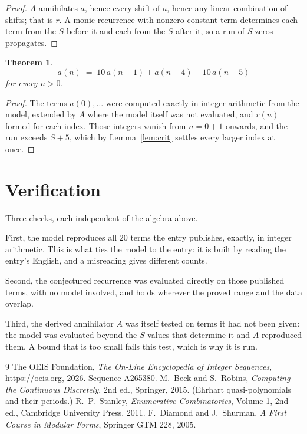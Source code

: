 \documentclass[11pt,a4paper]{article}
\theoremstyle{plain}
\newtheorem{theorem}{Theorem}
\theoremstyle{definition}
\begin{document}
\begin{proof}
$A$ annihilates $a$, hence every shift of $a$, hence any linear combination of shifts; that is
$r$. A monic recurrence with nonzero constant term determines each term from the $S$ before it
and each from the $S$ after it, so a run of $S$ zeros propagates.
\end{proof}

\begin{theorem}
\[
a(n)\;=\;10\,a(n-1) + a(n-4) - 10\,a(n-5)
\]
for every $n>0$.
\end{theorem}

\begin{proof}
The terms $a(0),\dots$ were computed exactly in integer arithmetic from the model, extended by
$A$ where the model itself was not evaluated, and $r(n)$ formed for each index. Those integers
vanish from $n=0+1$ onwards, and the run exceeds $S+5$, which by
Lemma~\ref{lem:crit} settles every larger index at once.
\end{proof}

\section{Verification}

Three checks, each independent of the algebra above.

First, the model reproduces all $20$ terms the entry publishes, exactly, in integer
arithmetic. This is what ties the model to the entry: it is built by reading the entry's
English, and a misreading gives different counts.

Second, the conjectured recurrence was evaluated directly on those published terms, with no
model involved, and holds wherever the proved range and the data overlap.

Third, the derived annihilator $A$ was itself tested on terms it had not been given: the model
was evaluated beyond the $S$ values that determine it and $A$ reproduced them. A bound that is
too small fails this test, which is why it is run.

\begin{thebibliography}{9}
 The OEIS Foundation, \emph{The On-Line Encyclopedia of Integer
Sequences}, \url{https://oeis.org}, 2026. Sequence A265380.
 M.~Beck and S.~Robins, \emph{Computing the Continuous Discretely},
2nd ed., Springer, 2015. (Ehrhart quasi-polynomials and their periods.)
 R.~P.~Stanley, \emph{Enumerative Combinatorics}, Volume 1, 2nd ed.,
Cambridge University Press, 2011.
 F.~Diamond and J.~Shurman, \emph{A First Course in Modular Forms},
Springer GTM 228, 2005.
\end{thebibliography}
\end{document}

